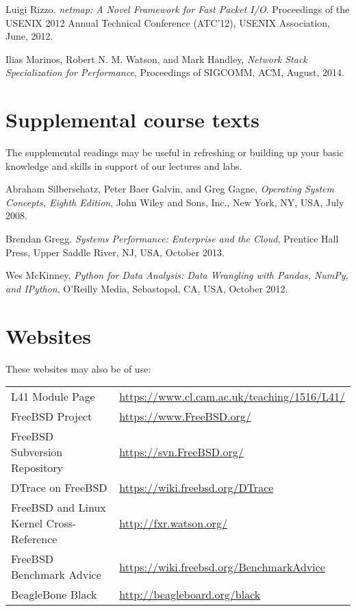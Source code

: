 \documentclass[a4paper,10pt]{article}
\begin{document}
\medskip
\noindent
Luigi Rizzo.  \textit{netmap: A Novel Framework for Fast Packet I/O}.
Proceedings of the USENIX 2012 Annual Technical Conference (ATC'12), USENIX
Association, June, 2012.

\medskip
\noindent
Ilias Marinos, Robert N. M. Watson, and Mark Handley, \textit{Network Stack
Specialization for Performance}, Proceedings of SIGCOMM, ACM, August, 2014.

\section*{Supplemental course texts}

The supplemental readings may be useful in refreshing or building up your
basic knowledge and skills in support of our lectures and labs.

\medskip

\noindent
Abraham Silberschatz, Peter Baer Galvin, and Greg Gagne, \textit{Operating
System Concepts, Eighth Edition}, John Wiley and Sons, Inc., New York, NY, USA,
July 2008.

\medskip
\noindent
Brendan Gregg. \textit{Systems Performance: Enterprise and the Cloud},
Prentice Hall Press, Upper Saddle River, NJ, USA, October 2013.

\medskip
\noindent
Wes McKinney, \textit{Python for Data Analysis: Data Wrangling with Pandas,
NumPy, and IPython}, O'Reilly Media, Sebastopol, CA, USA, October 2012.

\section*{Websites}

These websites may also be of use:

\bigskip

\begin{tabular}{ll}
L41 Module Page & \url{https://www.cl.cam.ac.uk/teaching/1516/L41/} \\
FreeBSD Project & \url{https://www.FreeBSD.org/} \\
FreeBSD Subversion Repository & \url{https://svn.FreeBSD.org/} \\
DTrace on FreeBSD & \url{https://wiki.freebsd.org/DTrace} \\
FreeBSD and Linux Kernel Cross-Reference & \url{http://fxr.watson.org/} \\
FreeBSD Benchmark Advice & \url{https://wiki.freebsd.org/BenchmarkAdvice} \\
BeagleBone Black & \url{http://beagleboard.org/black} \\
\end{tabular}
\end{document}
